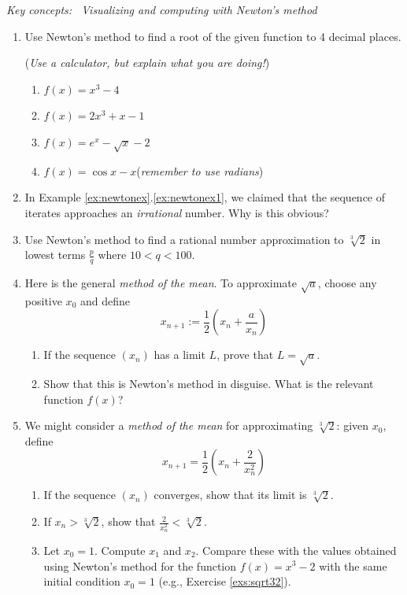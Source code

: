 \begin{exercises}{}{}	
	\hangindent\leftmargini
	\emph{Key concepts: \ Visualizing and computing with Newton's method}
	
	\begin{enumerate}
  	\item Use Newton's method to find a root of the given function to 4 decimal places.\par
  	(\emph{Use a calculator, but explain what you are doing!})
  	\begin{enumerate}
    	\item $f(x)=x^3-4$
    	\item $f(x)=2x^3+x-1$
    	\item $f(x)=e^x-\sqrt x-2$
    	\item $f(x)=\cos x-x$\quad (\emph{remember to use radians})
  	\end{enumerate}
  	
  	
  	\item In Example \ref*{ex:newtonex}.\ref{ex:newtonex1}, we claimed that the sequence of iterates approaches an \emph{irrational} number. Why is this obvious?
  	
  
  	\item\label{exs:sqrt32} Use Newton's method to find a rational number approximation to $\sqrt[3]{2}$ in lowest terms $\frac pq$ where $10<q<100$.
  	
  	
  	\item\label{exs:methodmeangen} Here is the general \emph{method of the mean}. To approximate $\sqrt a$, choose any positive $x_0$ and define
  	\[
  		x_{n+1}:=\frac 12\left(x_n+\frac a{x_n}\right)
  	\]\vspace{-3pt}
  	\begin{enumerate}
  	  \item If the sequence $(x_n)$ has a limit $L$, prove that $L=\sqrt a$.
  	  \item Show that this is Newton's method in disguise. What is the relevant function $f(x)$? 
		\end{enumerate}
		
		
		\item We might consider a \emph{method of the mean} for approximating $\sqrt[3]{2}$: given $x_0$, define
		\[
			x_{n+1}=\frac 12\left(x_n+\frac 2{x_n^2}\right)
		\]\vspace{-3pt}
		\begin{enumerate}
		  \item If the sequence $(x_n)$ converges, show that its limit is $\sqrt[3]{2}$.
		  \item If $x_n>\sqrt[3]{2}$, show that $\frac 2{x_n^2}<\sqrt[3]{2}$.
		  \item Let $x_0=1$. Compute $x_1$ and $x_2$. Compare these with the values obtained using Newton's method for the function $f(x)=x^3-2$ with the same initial condition $x_0=1$ (e.g., Exercise \ref{exs:sqrt32}).
		\end{enumerate}
		

\end{enumerate}
\end{exercises}
